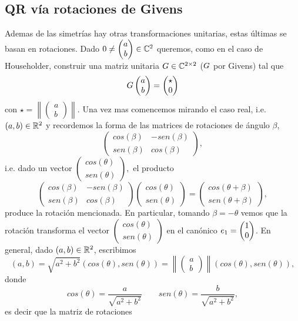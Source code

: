 \begin{tcolorbox}
\section{QR vía rotaciones de Givens}
Ademas de las simetrías hay otras transformaciones unitarias, estas últimas se basan en rotaciones. Dado $\cero\neq
\begin{pmatrix}
a\\
b
\end{pmatrix}
\in \C^2$ queremos, como en el caso de Householder, construir una matriz unitaria $\Gb\in \C^{2\times 2}$ ($\Gb$ por Givens) tal que
$$
\Gb\begin{pmatrix}
a\\
b
\end{pmatrix}
=
\begin{pmatrix}
\star\\
0
\end{pmatrix}
$$
con $\star=\left\|
\begin{pmatrix}
a\\
b
\end{pmatrix}\right\|.
$
Una vez mas comencemos mirando el caso real, i.e. $(a,b)\in \mathbb R^{2}$ y recordemos la forma de las matrices de rotaciones de ángulo $\beta$,
$$
\begin{pmatrix}
 cos(\beta)&-sen(\beta)\\
 sen(\beta)&cos(\beta)
\end{pmatrix},
$$
i.e. dado un vector $\begin{pmatrix}
cos(\theta)\\
sen(\theta)
\end{pmatrix},$ el producto
$$\begin{pmatrix}
 cos(\beta)&-sen(\beta)\\
 sen(\beta)&cos(\beta)
\end{pmatrix}\begin{pmatrix}
cos(\theta)\\
sen(\theta)
\end{pmatrix}=\begin{pmatrix}
cos(\theta+\beta)\\
sen(\theta+\beta)
\end{pmatrix},$$
produce la rotación mencionada. En particular, tomando $\beta=-\theta$ vemos que la rotación transforma el vector $\begin{pmatrix}
cos(\theta)\\
sen(\theta)
\end{pmatrix}$ en el canónico $\eb_1=\begin{pmatrix}
1\\
0
\end{pmatrix}$.
En general, dado $(a,b)\in \mathbb R^{2}$, escribimos
$$
(a,b)= \sqrt{a^2+b^2}(cos(\theta),sen(\theta))=
\left\|
\begin{pmatrix}
a\\
b
\end{pmatrix}\right\|(cos(\theta),sen(\theta)),
$$
donde
$$
cos(\theta)=\frac{a}{\sqrt{a^2+b^2}}\qquad
sen(\theta)=\frac{b}{\sqrt{a^2+b^2}},
$$
es decir que la matriz de rotaciones


\end{tcolorbox}
